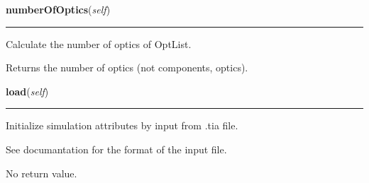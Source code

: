     \vspace{0.5ex}

\hspace{.8\funcindent}\begin{boxedminipage}{\funcwidth}

    \raggedright \textbf{numberOfOptics}(\textit{self})

    \vspace{-1.5ex}

    \rule{\textwidth}{0.5\fboxrule}
\setlength{\parskip}{2ex}
    Calculate the number of optics of OptList.

    Returns the number of optics (not components, optics).

\setlength{\parskip}{1ex}
    \end{boxedminipage}

    \label{theia:running:simulation:Simulation:load}

    \vspace{0.5ex}

\hspace{.8\funcindent}\begin{boxedminipage}{\funcwidth}

    \raggedright \textbf{load}(\textit{self})

    \vspace{-1.5ex}

    \rule{\textwidth}{0.5\fboxrule}
\setlength{\parskip}{2ex}
    Initialize simulation attributes by input from .tia file.

    See documantation for the format of the input file.

    No return value.

\setlength{\parskip}{1ex}
    \end{boxedminipage}

    \label{theia:running:simulation:Simulation:run}

    \vspace{0.5ex}

